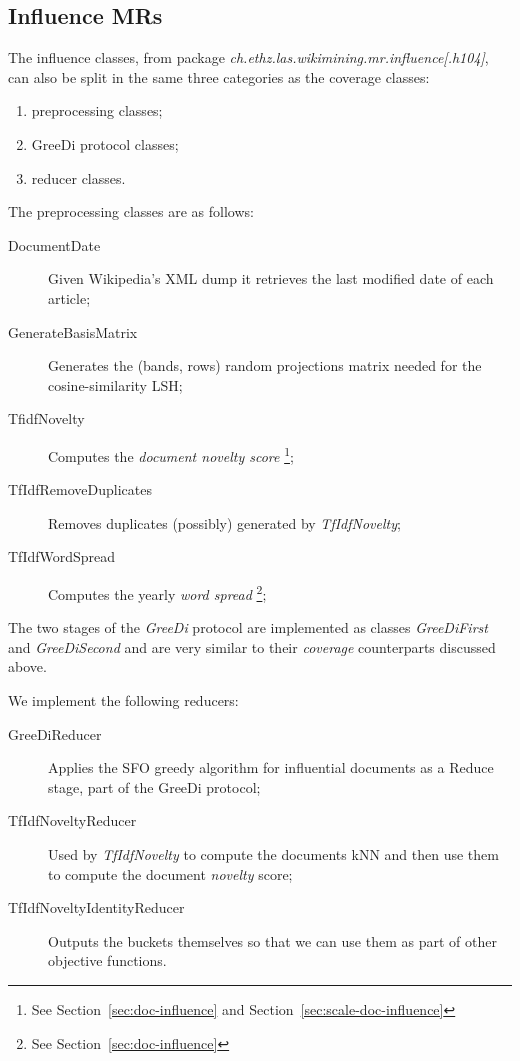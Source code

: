\subsection{Influence \aclp{MR}}

The influence classes, from package
\emph{ch.ethz.las.wikimining.mr.influence[.h104]}, can also be split in the same
three categories as the coverage classes:
\begin{enumerate}
  \item preprocessing classes;
  \item GreeDi protocol classes;
  \item reducer classes.
\end{enumerate}

The preprocessing classes are as follows:
\begin{description}
  \item[DocumentDate] Given Wikipedia's \ac{XML} dump it retrieves the last
  modified date of each article;
  \item[GenerateBasisMatrix] Generates the (bands, rows) random projections
  matrix needed for the cosine-similarity \ac{LSH};
  \item[TfidfNovelty] Computes the \emph{document novelty score} \footnote{See
  Section~\vref{sec:doc-influence} and Section~\vref{sec:scale-doc-influence}};
  \item[TfIdfRemoveDuplicates] Removes duplicates (possibly) generated by
    \emph{TfIdfNovelty};
  \item[TfIdfWordSpread] Computes the yearly \emph{word spread} \footnote{See
    Section~\vref{sec:doc-influence}};
\end{description}

The two stages of the \emph{GreeDi} protocol are implemented as classes
\emph{GreeDiFirst} and \emph{GreeDiSecond} and are very similar to their
\emph{coverage} counterparts discussed above.

We implement the following reducers:
\begin{description}
  \item[GreeDiReducer] Applies the \ac{SFO} greedy algorithm for influential
  documents as a Reduce stage, part of the GreeDi protocol;
  \item[TfIdfNoveltyReducer] Used by \emph{TfIdfNovelty} to compute the
  documents \ac{kNN} and then use them to compute the document \emph{novelty}
  score;
  \item[TfIdfNoveltyIdentityReducer] Outputs the buckets themselves so that we
  can use them as part of other objective functions.
\end{description}

